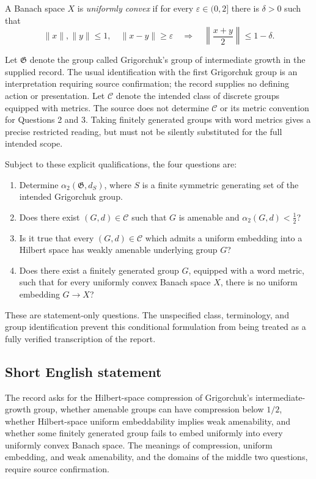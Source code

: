\documentclass[11pt]{article}
\begin{document}
A Banach space \(X\) is \emph{uniformly convex} if for every \(\varepsilon\in(0,2]\) there is \(\delta>0\) such that
\[
\|x\|,\|y\|\leq1,\quad\|x-y\|\geq\varepsilon
\quad\Longrightarrow\quad
\left\|\frac{x+y}{2}\right\|\leq1-\delta.
\]

Let \(\mathfrak G\) denote the group called Grigorchuk's group of intermediate growth in the supplied record. The usual identification with the first Grigorchuk group is an interpretation requiring source confirmation; the record supplies no defining action or presentation. Let \(\mathcal C\) denote the intended class of discrete groups equipped with metrics. The source does not determine \(\mathcal C\) or its metric convention for Questions 2 and 3. Taking finitely generated groups with word metrics gives a precise restricted reading, but must not be silently substituted for the full intended scope.

Subject to these explicit qualifications, the four questions are:
\begin{enumerate}
\item Determine \(\alpha_2(\mathfrak G,d_S)\), where \(S\) is a finite symmetric generating set of the intended Grigorchuk group.
\item Does there exist \((G,d)\in\mathcal C\) such that \(G\) is amenable and \(\alpha_2(G,d)<\tfrac12\)?
\item Is it true that every \((G,d)\in\mathcal C\) which admits a uniform embedding into a Hilbert space has weakly amenable underlying group \(G\)?
\item Does there exist a finitely generated group \(G\), equipped with a word metric, such that for every uniformly convex Banach space \(X\), there is no uniform embedding \(G\to X\)?
\end{enumerate}
These are statement-only questions. The unspecified class, terminology, and group identification prevent this conditional formulation from being treated as a fully verified transcription of the report.
\subsection{Short English statement}
The record asks for the Hilbert-space compression of Grigorchuk's intermediate-growth group, whether amenable groups can have compression below \(1/2\), whether Hilbert-space uniform embeddability implies weak amenability, and whether some finitely generated group fails to embed uniformly into every uniformly convex Banach space. The meanings of compression, uniform embedding, and weak amenability, and the domains of the middle two questions, require source confirmation.
\end{document}
